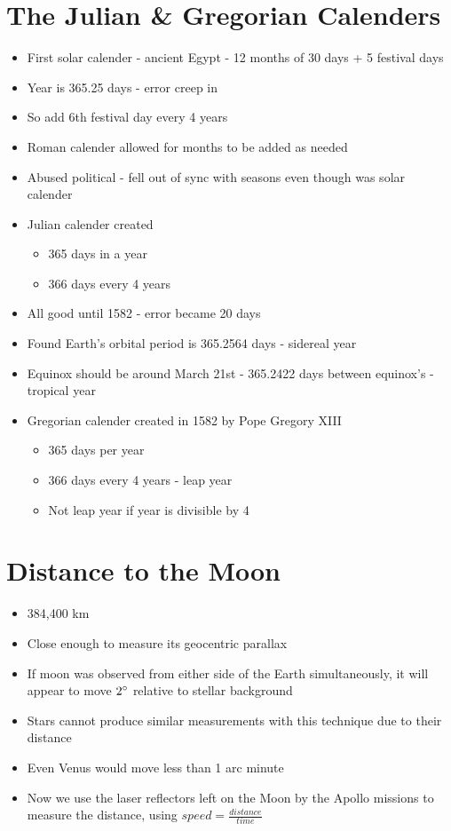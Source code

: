 \documentclass[a4paper, 11pt]{article}
\begin{document}
\section{The Julian \& Gregorian Calenders}
	\begin{itemize}
		\item First solar calender - ancient Egypt - 12 months of 30 days + 5 festival days
		\item Year is 365.25 days - error creep in
		\item So add 6th festival day every 4 years
		\item Roman calender allowed for months to be added as needed
		\item Abused political - fell out of sync with seasons even though was solar calender
		\item Julian calender created
		\begin{itemize}
			\item 365 days in a year
			\item 366 days every 4 years
		\end{itemize}
		\item All good until 1582 - error became 20 days
		\item Found Earth's orbital period is 365.2564 days - sidereal year
		\item Equinox should be around March 21st - 365.2422 days between equinox's - tropical year
		\item Gregorian calender created in 1582 by Pope Gregory XIII
		\begin{itemize}
			\item 365 days per year
			\item 366 days every 4 years - leap year
			\item Not leap year if year is divisible by 4
		\end{itemize}
	\end{itemize}

\section{Distance to the Moon}
	\begin{itemize}
		\item 384,400 km
		\item Close enough to measure its geocentric parallax 
		\item If moon was observed from either side of the Earth simultaneously, it will appear to move \(2\degree\) relative to stellar background
		\item Stars cannot produce similar measurements with this technique due to their distance
		\item Even Venus would move less than 1 arc minute
		\item Now we use the laser reflectors left on the Moon by the Apollo missions to measure the distance, using \(speed = \frac{distance}{time}\)
	\end{itemize}
\end{document}
